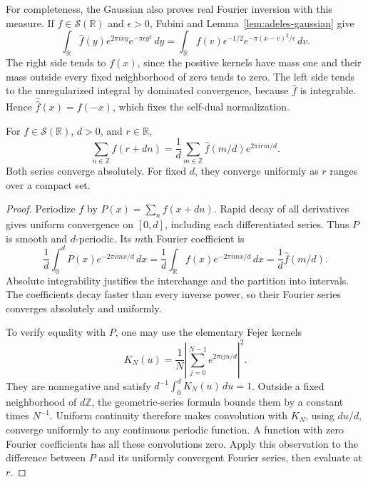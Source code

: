 For completeness, the Gaussian also proves real Fourier inversion with
this measure. If \(f\in\mathcal S(\mathbb R)\) and \(\epsilon>0\), Fubini
and Lemma~\ref{lem:adeles-gaussian} give
\[
 \int_{\mathbb R}\widehat f(y)e^{2\pi ixy}e^{-\pi\epsilon y^2}\,dy
 =\int_{\mathbb R}f(v)\epsilon^{-1/2}
       e^{-\pi(x-v)^2/\epsilon}\,dv.
\]
The right side tends to \(f(x)\), since the positive kernels have mass one
and their mass outside every fixed neighborhood of zero tends to zero.
The left side tends to the unregularized integral by dominated convergence,
because \(\widehat f\) is integrable. Hence
\(\widehat{\widehat f}(x)=f(-x)\), which fixes the self-dual normalization.

\begin{proposition}
\label{prop:adeles-real-poisson}
For \(f\in\mathcal S(\mathbb R)\), \(d>0\), and \(r\in\mathbb R\),
\begin{equation}
 \sum_{n\in\mathbb Z}f(r+dn)
 =\frac1d\sum_{m\in\mathbb Z}
       \widehat f(m/d)e^{2\pi irm/d}.
 \label{eq:adeles-real-poisson}
\end{equation}
Both series converge absolutely. For fixed \(d\), they converge uniformly
as \(r\) ranges over a compact set.
\end{proposition}

\begin{proof}
Periodize \(f\) by \(P(x)=\sum_n f(x+dn)\). Rapid decay of all derivatives
gives uniform convergence on \([0,d]\), including each differentiated
series. Thus \(P\) is smooth and \(d\)-periodic.
Its \(m\)th Fourier coefficient is
\[
 \frac1d\int_0^dP(x)e^{-2\pi imx/d}\,dx
 =\frac1d\int_{\mathbb R}f(x)e^{-2\pi imx/d}\,dx
 =\frac1d\widehat f(m/d).
\]
Absolute integrability justifies the interchange and the partition into
intervals. The coefficients decay faster than every inverse power, so
their Fourier series converges absolutely and uniformly.

To verify equality with \(P\), one may use the elementary Fejer kernels
\[
 K_N(u)=\frac1N\left|\sum_{j=0}^{N-1}e^{2\pi iju/d}\right|^2.
\]
They are nonnegative and satisfy \(d^{-1}\int_0^dK_N(u)\,du=1\).
Outside a fixed neighborhood of \(d\mathbb Z\), the geometric-series
formula bounds them by a constant times \(N^{-1}\).
Uniform continuity therefore makes convolution with \(K_N\), using
\(du/d\), converge uniformly to any continuous periodic function.
A function with zero Fourier coefficients has all these convolutions zero.
Apply this observation to the difference between \(P\) and its uniformly
convergent Fourier series, then evaluate at \(r\).
\end{proof}


